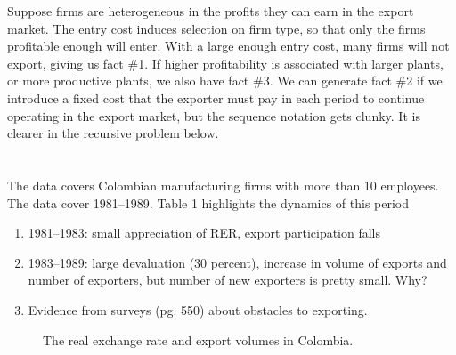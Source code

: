 \documentclass[11pt, pdftex]{article}
\begin{document}
Suppose firms are heterogeneous in the profits they can earn in the export market.  The entry cost induces selection on firm type, so that only the firms profitable enough will enter.  With a large enough entry cost, many firms will not export, giving us fact \#1.  If higher profitability is associated with larger plants, or more productive plants, we also have fact \#3. We can generate fact \#2 if we introduce a fixed cost that the exporter must pay in each period to continue operating  in the export market,  but the sequence notation gets clunky.  It is clearer in the recursive problem below.
\section{\citet{robertsTybout97}}
The data covers Colombian manufacturing firms with more than 10 employees.  The data cover 1981--1989.  Table 1 highlights the dynamics of this period
\begin{enumerate}
  \item 1981--1983: small appreciation of RER, export participation falls
  \item 1983--1989: large devaluation (30 percent), increase in volume of exports and number of exporters, but number of new exporters is pretty small.  Why?
  \item Evidence from surveys (pg. 550) about obstacles to exporting.
\end{enumerate}

\begin{figure}
\centering
\caption{The real exchange rate and export volumes in Colombia.}
\label{fig:rer}
\end{figure}
\end{document}
